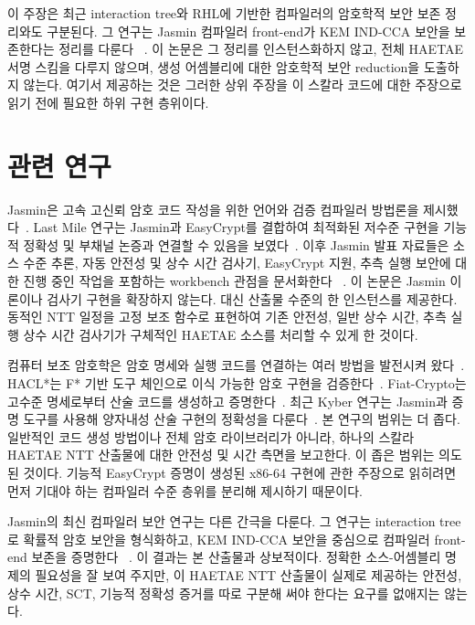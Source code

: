 \documentclass[10pt,twocolumn]{article}
\newcommand{\haetae}{HAETAE}
\newcommand{\jasmin}{Jasmin}
\newcommand{\ct}{상수 시간}
\newcommand{\sct}{추측 실행 상수 시간}
\begin{document}
이 주장은 최근 interaction tree와 RHL에 기반한 컴파일러의 암호학적
보안 보존 정리와도 구분된다. 그 연구는 \jasmin{} 컴파일러 front-end가
KEM IND-CCA 보안을 보존한다는 정리를 다룬다
~\cite{ArranzOlmos2025JasminSecurity}. 이 논문은 그 정리를 인스턴스화하지
않고, 전체 \haetae{} 서명 스킴을 다루지 않으며, 생성 어셈블리에 대한
암호학적 보안 reduction을 도출하지 않는다. 여기서 제공하는 것은 그러한
상위 주장을 이 스칼라 코드에 대한 주장으로 읽기 전에 필요한 하위 구현
층위이다.

\section{관련 연구}

\jasmin{}은 고속 고신뢰 암호 코드 작성을 위한 언어와 검증 컴파일러
방법론을 제시했다~\cite{Jasmin2017}. Last Mile 연구는 \jasmin{}과
EasyCrypt를 결합하여 최적화된 저수준 구현을 기능적 정확성 및 부채널
논증과 연결할 수 있음을 보였다~\cite{LastMile2020}. 이후 \jasmin{}
발표 자료들은 소스 수준 추론, 자동 안전성 및 \ct{} 검사기, EasyCrypt
지원, 추측 실행 보안에 대한 진행 중인 작업을 포함하는 workbench 관점을
문서화한다
~\cite{JasminWorkshop2021,JasminWorkbench2023,JasminCourse2024,JasminFramework2026}.
이 논문은 \jasmin{} 이론이나 검사기 구현을 확장하지 않는다. 대신
산출물 수준의 한 인스턴스를 제공한다. 동적인 NTT 일정을 고정 보조
함수로 표현하여 기존 안전성, 일반 \ct{}, \sct{} 검사기가 구체적인
\haetae{} 소스를 처리할 수 있게 한 것이다.

컴퓨터 보조 암호학은 암호 명세와 실행 코드를 연결하는 여러 방법을
발전시켜 왔다~\cite{ComputerAidedCrypto2021}. HACL*는 F* 기반 도구
체인으로 이식 가능한 암호 구현을 검증한다~\cite{HACL2017}. Fiat-Crypto는
고수준 명세로부터 산술 코드를 생성하고 증명한다~\cite{FiatCrypto2019}.
최근 Kyber 연구는 \jasmin{}과 증명 도구를 사용해 양자내성 산술 구현의
정확성을 다룬다~\cite{KyberVerify2023}. 본 연구의 범위는 더 좁다.
일반적인 코드 생성 방법이나 전체 암호 라이브러리가 아니라, 하나의
스칼라 \haetae{} NTT 산출물에 대한 안전성 및 시간 측면을 보고한다.
이 좁은 범위는 의도된 것이다. 기능적 EasyCrypt 증명이 생성된 x86-64
구현에 관한 주장으로 읽히려면 먼저 기대야 하는 컴파일러 수준 층위를
분리해 제시하기 때문이다.

\jasmin{}의 최신 컴파일러 보안 연구는 다른 간극을 다룬다. 그 연구는
interaction tree로 확률적 암호 보안을 형식화하고, KEM IND-CCA 보안을
중심으로 컴파일러 front-end 보존을 증명한다
~\cite{ArranzOlmos2025JasminSecurity}. 이 결과는 본 산출물과 상보적이다.
정확한 소스-어셈블리 명제의 필요성을 잘 보여 주지만, 이 HAETAE NTT
산출물이 실제로 제공하는 안전성, \ct{}, SCT, 기능적 정확성 증거를
따로 구분해 써야 한다는 요구를 없애지는 않는다.
\end{document}
